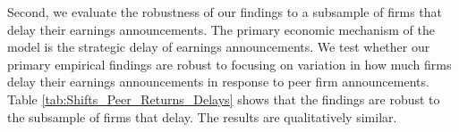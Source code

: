 \documentclass[ecta,nameyear,draft]{econsocart}
\theoremstyle{theorem}
\numberwithin{lemma}{section}
\numberwithin{proposition}{section}
\numberwithin{equation}{section}
\numberwithin{figure}{section}
\begin{document}
Second, we evaluate the robustness of our findings to a subsample of firms that delay their earnings announcements. The primary economic mechanism of the model is the strategic delay of earnings announcements. We test whether our primary empirical findings are robust to focusing on variation in how much firms delay their earnings announcements in response to peer firm announcements. Table \ref{tab:Shifts_Peer_Returns_Delays} shows that the findings are robust to the subsample of firms that delay. The results are qualitatively similar. 


\newpage{}

{}



\newpage{}


\newpage{}

\end{document}
